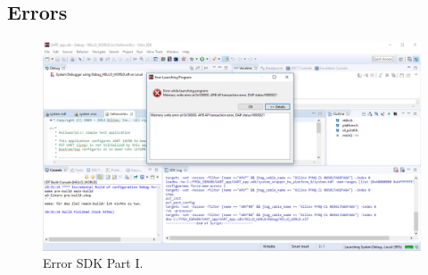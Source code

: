\subsection{Errors}\label{subsec: Errors}
\begin{figure}[H]
	\centering
	\includegraphics[width=1.0\textwidth]{01_images/Vivado_lab4_part1_SecondErrorSDK.PNG}
	\caption{Error SDK Part I.}
	\label{fig: Vivado_lab4_part1_SecondErrorSDK}
\end{figure}
%
